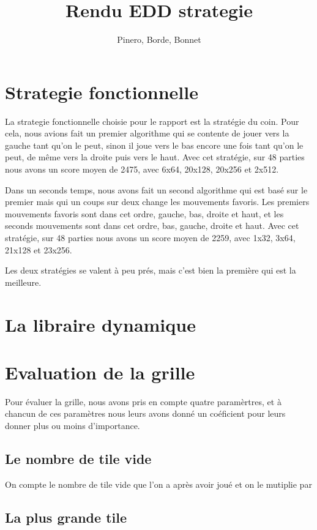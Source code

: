 \documentclass{article}
\title{Rendu EDD strategie}
\author{Pinero, Borde, Bonnet}
\begin{document}
\maketitle
\tableofcontents

\newpage
\section{Strategie fonctionnelle}
La strategie fonctionnelle choisie pour le rapport est la stratégie du coin. Pour cela, nous avions fait un premier algorithme qui se contente de jouer vers la gauche tant qu'on le peut, sinon il joue vers le bas encore une fois tant qu'on le peut, de même vers la droite puis vers le haut. Avec cet stratégie, sur 48 parties nous avons un score moyen de 2475, avec 6x64, 20x128, 20x256 et 2x512.

Dans un seconds temps, nous avons fait un second algorithme qui est basé sur le premier mais qui un coups sur deux change les mouvements favoris. Les premiers mouvements favoris sont dans cet ordre, gauche, bas, droite et haut, et les seconds mouvements sont dans cet ordre, bas, gauche, droite et haut. Avec cet stratégie, sur 48 parties nous avons un score moyen de 2259, avec 1x32, 3x64, 21x128 et 23x256.

Les deux stratégies se valent à peu prés, mais c'est bien la première qui est la meilleure.

\section{La libraire dynamique}


\section{Evaluation de la grille}
\label{eval_grid}
Pour évaluer la grille, nous avons pris en compte quatre paramèrtres, et à chancun de ces paramètres nous leurs avons donné un coéficient pour leurs donner plus ou moins d'importance. 


	\subsection{Le nombre de tile vide}
	On compte le nombre de tile vide que l'on a après avoir joué et on le mutiplie par

	\subsection{La plus grande tile} 
\end{document}
